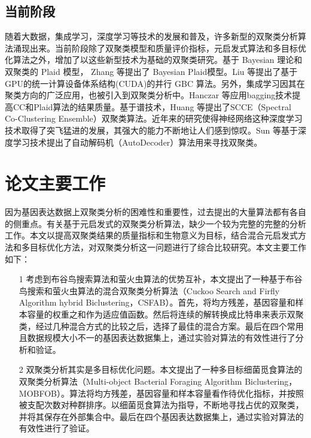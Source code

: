     \subsection{当前阶段}
    随着大数据，集成学习，深度学习等技术的发展和普及，许多新型的双聚类分析算法涌现出来。当前阶段除了双聚类模型和质量评价指标，元启发式算法和多目标优化算法之外，增加了以这些新型技术为基础的双聚类研究。基于 Bayesian 理论和双聚类的 Plaid 模型， Zhang 等提出了 Bayesian Plaid模型。Liu 等提出了基于GPU的统一计算设备体系结构(CUDA)的并行 GBC 算法。另外，集成学习因其在聚类方向的广泛应用，也被引入到双聚类分析中。Hanczar 等应用bagging技术提高CC和Plaid算法的结果质量。基于谱技术，Huang 等提出了SCCE（Spectral Co-Clustering Ensemble）双聚类算法。近年来的研究使得神经网络这种深度学习技术取得了突飞猛进的发展，其强大的能力不断地让人们感到惊叹。Sun 等基于深度学习技术提出了自动解码机（AutoDecoder）算法用来寻找双聚类。

    

\section{论文主要工作}
    因为基因表达数据上双聚类分析的困难性和重要性，过去提出的大量算法都有各自的侧重点。有关基于元启发式的双聚类分析算法，缺少一个较为完整的完整的分析工作。本文以提高双聚类结果的质量指标和生物意义为目标，结合混合元启发式方法和多目标优化方法，对双聚类分析这一问题进行了综合比较研究。本文主要工作如下：
    \begin{itemize}
       \item[1] {考虑到布谷鸟搜索算法和萤火虫算法的优势互补，本文提出了一种基于布谷鸟搜索和萤火虫算法的混合双聚类分析算法（Cuckoo Search and Firfly Algorithm hybrid Biclustering，CSFAB）。首先，将均方残差，基因容量和样本容量的权重之和作为适应值函数。然后将连续的解转换成比特串来表示双聚类，经过几种混合方式的比较之后，选择了最佳的混合方案。最后在四个常用且数据规模大小不一的基因表达数据集上，通过实验对算法的有效性进行了分析和验证。}

       \item[2] {双聚类分析其实是多目标优化问题。本文提出了一种多目标细菌觅食算法的双聚类分析算法（Multi-object Bacterial Foraging Algorithm Biclustering，MOBFOB）。算法将均方残差，基因容量和样本容量看作待优化指标，并按照被支配次数对种群排序。以细菌觅食算法为指导，不断地寻找占优的双聚类，并将其保存在外部集合中。最后在四个基因表达数据集上，通过实验对算法的有效性进行了验证。}
       
    \end{itemize}

